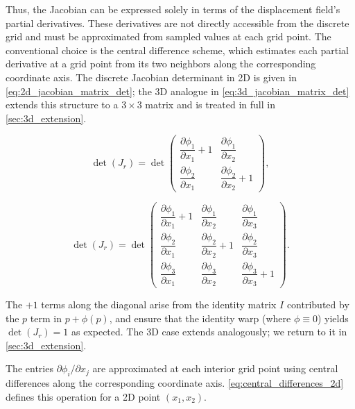 Thus, the Jacobian can be expressed solely in terms of the displacement field's partial derivatives. These derivatives are not directly accessible from the discrete grid and must be approximated from sampled values at each grid point. The conventional choice is the central difference scheme, which estimates each partial derivative at a grid point from its two neighbors along the corresponding coordinate axis. The discrete Jacobian determinant in 2D is given in \autoref{eq:2d_jacobian_matrix_det}; the 3D analogue in \autoref{eq:3d_jacobian_matrix_det} extends this structure to a $3\times 3$ matrix and is treated in full in \autoref{sec:3d_extension}.

\begin{equation} \label{eq:2d_jacobian_matrix_det}
    \det(J_r) = 
\det\begin{pmatrix}
    \dfrac{\partial \phi_1}{\partial x_1} + 1 & \dfrac{\partial \phi_1}{\partial x_2} \\[6pt]
    \dfrac{\partial \phi_2}{\partial x_1} & \dfrac{\partial \phi_2}{\partial x_2} + 1
\end{pmatrix},
\end{equation}

\begin{equation} \label{eq:3d_jacobian_matrix_det}
    \det(J_r) = 
    \det\begin{pmatrix}
        \dfrac{\partial \phi_1}{\partial x_1} + 1 & \dfrac{\partial \phi_1}{\partial x_2} & \dfrac{\partial \phi_1}{\partial x_3} \\[6pt]
        \dfrac{\partial \phi_2}{\partial x_1} & \dfrac{\partial \phi_2}{\partial x_2} + 1 & \dfrac{\partial \phi_2}{\partial x_3} \\[6pt]
        \dfrac{\partial \phi_3}{\partial x_1} & \dfrac{\partial \phi_3}{\partial x_2} & \dfrac{\partial \phi_3}{\partial x_3} + 1
    \end{pmatrix}.
\end{equation}

The $+ 1$ terms along the diagonal arise from the identity matrix $I$ contributed by the $p$ term in $p + \phi(p)$, and ensure that the identity warp (where $\phi \equiv 0$) yields $\det(J_r) = 1$ as expected. The 3D case extends analogously; we return to it in \autoref{sec:3d_extension}.

The entries $\partial \phi_i / \partial x_j$ are approximated at each interior grid point using central differences along the corresponding coordinate axis. \autoref{eq:central_differences_2d} defines this operation for a 2D point $(x_1, x_2)$.

